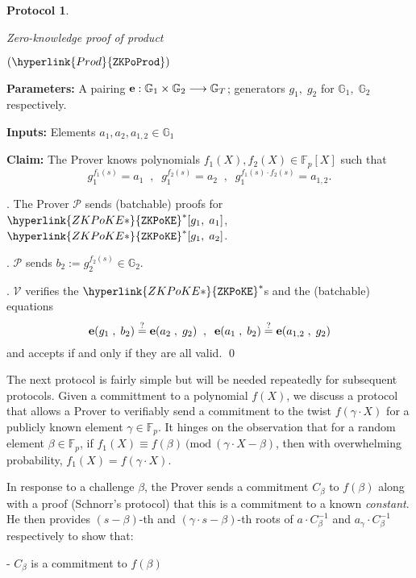 \documentclass[11pt, lettersize, notitlepage, leqno, footskip=0.6cm]{article}
\newcommand{\bFp}{\mathbb{F}_p}
\newcommand{\bG}{\mathbb{G}}
\newcommand{\lra}{\longrightarrow}
\newcommand{\mc}{\mathcal}
\newcommand{\mb}{\mathbb}
\newcommand{\mbf}{\mathbf}
\newcommand{\be}{\beta}
\newcommand{\mP}{\mc{P}}
\newcommand{\V}{\mc{V}}
\newcommand{\vs}{\vspace{-0.15cm}}
\newcommand{\noin}{\noindent}
\newcommand{\op}{overwhelming probability}
\newcommand{\sta}{\stackrel{?}{=}}
\newcommand{\Mod}[1]{\ (\mathrm{mod}\ #1)}
\newcommand{\e}{\mbf{e}}
\newtheorem{Prot}[Thm]{Protocol}
\numberwithin{equation}{section}
\begin{document}
\begin{mdframed}
\begin{Prot} \hypertarget{Prod}{Zero-knowledge proof of product} $(\hyperlink{Prod}{\tt{ZKPoProd}})$\end{Prot}  

\noin \textbf{Parameters:} A pairing ${\bf{e}}:\mb{G}_1\times \mb{G}_2\lra \mb{G}_T$; generators $g_1,\;g_2$ for $\mb{G}_1,\; \mb{G}_2$ respectively.


\noindent \textbf{Inputs:} Elements $a_1, a_2, a_{1,2}\in \mb{G}_1$

\noin \textbf{Claim:} The Prover knows polynomials $f_1(X),f_2(X)\in \bFp[X]$ such that $$g_1^{f_1(s)} = a_1\;\;,\;\; g_1^{f_2(s)} = a_2\;\;,\;\;g_1^{f_1(s)\cdot f_2(s)} = a_{1,2}. $$

\noin 1. The Prover $\mP$ sends (batchable) proofs for $\hyperlink{ZKPoKE*}{\tt{ZKPoKE}}^*[g_1,\;a_1]$, $\hyperlink{ZKPoKE*}{\tt{ZKPoKE}}^*[g_1,\;a_2]$.

\noin 2. $\mP$ sends $b_2:= g_2^{f_2(s)}\in \bG_2$.

\noin 3. $\V$ verifies the $\hyperlink{ZKPoKE*}{\tt{ZKPoKE}}^*$s and the (batchable) equations \vs $$\e(g_1\;,\;b_2)\sta \e(a_2\;,\;g_2)\;\;,\;\;\e(a_1\;,\;b_2)\sta \e(a_{1,2}\;,\; g_2) \vs $$ and accepts if and only if they are all valid.  
\qed \end{mdframed}

\bigskip



The next protocol is fairly simple but will be needed repeatedly for subsequent protocols. Given a committment to a polynomial $f(X)$, we discuss a protocol that allows a Prover to verifiably send a commitment to the twist $f(\gamma\cdot X)$ for a publicly known element $\gamma\in \bFp$. It hinges on the observation that for a random element $\be\in\bFp$, if $f_1(X)\equiv f(\be) \Mod{(\gamma\cdot X-\be}$, then with \op, $f_1(X) = f(\gamma\cdot X)$. 

In response to a challenge $\be$, the Prover sends a commitment $C_{\be}$ to $f(\be)$ along with a proof (Schnorr's protocol) that this is a commitment to a known \textit{constant}. He then provides $(s-\be)$-th and $(\gamma\cdot s-\be)$-th roots of $a\cdot C_{\be}^{-1}$ and $a_{\gamma}\cdot C_{\be}^{-1}$ respectively to show that: \vspace{2mm}

\noin - $C_{\be}$ is a commitment to $f(\be)$ \vspace{1mm} 
\end{document}
